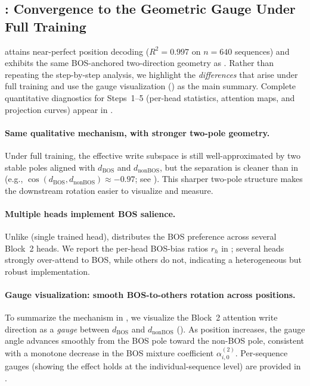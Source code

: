 \documentclass{article}
\theoremstyle{plain}
\theoremstyle{definition}
\theoremstyle{remark}
\begin{document}
\subsection{\modelfull: Convergence to the Geometric Gauge Under Full Training}
\label{subsec:full_evidence}

\modelfull attains near-perfect position decoding ($R^2=0.997$ on $n=640$ sequences) and exhibits the same BOS-anchored two-direction geometry as \modelminimal.
Rather than repeating the step-by-step analysis, we highlight the \emph{differences} that arise under full training and use the gauge visualization () as the main summary.
Complete quantitative diagnostics for Steps~1--5 (per-head statistics, attention maps, and projection curves) appear in .

\paragraph{Same qualitative mechanism, with stronger two-pole geometry.}
Under full training, the effective write subspace is still well-approximated by two stable poles aligned with
$d_{\text{BOS}}$ and $d_{\text{nonBOS}}$, but the separation is cleaner than in \modelminimal
(e.g., $\cos(d_{\text{BOS}},d_{\text{nonBOS}})\approx -0.97$; see ).
This sharper two-pole structure makes the downstream rotation easier to visualize and measure.

\paragraph{Multiple heads implement BOS salience.}
Unlike \modelminimal (single trained head), \modelfull distributes the BOS preference across several Block~2 heads.
We report the per-head BOS-bias ratios $r_h$ in ; several heads strongly over-attend to BOS,
while others do not, indicating a heterogeneous but robust implementation.

\paragraph{Gauge visualization: smooth BOS-to-others rotation across positions.}
To summarize the mechanism in \modelfull, we visualize the Block~2 attention write direction as a \emph{gauge} between
$d_{\text{BOS}}$ and $d_{\text{nonBOS}}$ ().
As position increases, the gauge angle advances smoothly from the BOS pole toward the non-BOS pole, consistent with a
monotone decrease in the BOS mixture coefficient $\alpha^{(2)}_{i,0}$.
Per-sequence gauges (showing the effect holds at the individual-sequence level) are provided in .
\end{document}
